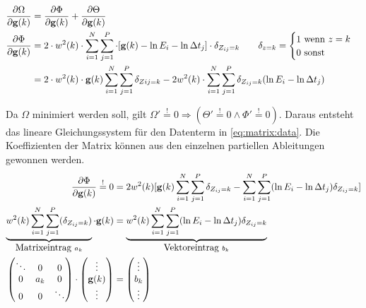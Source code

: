 \begin{align}
\label{eq:energy:partial}
\frac{\partial \Omega}{\partial \mathbf g(k)} & = \frac{\partial \Phi}{\partial \mathbf g(k)} +\frac{\partial \Theta}{\partial \mathbf g(k)}\\
\frac{\partial \Phi}{\partial \mathbf g(k)} &= 2\cdot w^2(k) \cdot \sum \limits_{i=1}^{N} \sum \limits_{j=1}^{P} \cdot[\mathbf g(k) - \ln E_i - \ln \Delta t_j]\cdot \delta_{Z_{ij}=k} \qquad \delta_{z=k} = \begin{cases}
    1 \mbox{ wenn } z = k\\
    0 \mbox{ sonst}
\end{cases}\\
&=2\cdot w^2(k) \cdot \mathbf g(k) \sum \limits_{i=1}^{N} \sum \limits_{j=1}^{P}\delta_{Z{ij}=k} - 2w^2(k)\cdot\sum \limits_{i=1}^{N} \sum \limits_{j=1}^{P}\delta_{Z_{ij}=k}(\ln E_i - \ln \Delta t_j)
\end{align}

Da $\Omega$ minimiert werden soll, gilt $\Omega' \overset{!}{=} 0 \Rightarrow (\Theta' \overset{!}{=} 0 \wedge \Phi' \overset{!}{=} 0)$. Daraus entsteht das lineare Gleichungssystem für den Datenterm in \autoref{eq:matrix:data}. Die Koeffizienten der Matrix können aus den einzelnen partiellen Ableitungen gewonnen werden.
\begin{align}
\frac{\partial \Phi}{\partial \mathbf g(k)} 
    \overset{!}{=} 0 & = 
    2 w^2(k) [\mathbf g(k) \sum_{i=1}^{N} \sum_{j=1}^{P}\delta_{Z_{ij}=k} - 
    \sum_{i=1}^{N} \sum_{j=1}^{P}(\ln E_i - \ln \Delta t_j)\delta_{Z_{ij}=k}]\\
    \underbrace{
        w^2(k) \sum_{i=1}^{N} \sum_{j=1}^{P}(\delta_{Z_{ij}=k})
    }_{\mbox{Matrixeintrag }a_k} 
    \cdot \mathbf g(k) &= 
    \underbrace{
        w^2(k) \sum_{i=1}^{N} \sum_{j=1}^{P}(\ln E_i - \ln \Delta t_j)\delta_{Z_{ij}=k}
    }_{\mbox{Vektoreintrag }b_k} \\ 
\begin{pmatrix}
\ddots & 0& 0\\
0 & a_k & 0\\
0 & 0 & \ddots
\end{pmatrix}
 \cdot \begin{pmatrix}
 \vdots\\
 \mathbf g(k)\\
 \vdots
 \end{pmatrix} &= \label{eq:matrix:data}
\begin{pmatrix}
 \vdots\\
 b_k\\
 \vdots
 \end{pmatrix} 
\end{align}


